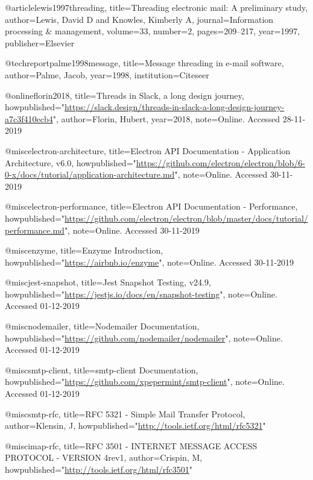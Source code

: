 
@article{lewis1997threading,
  title={{Threading electronic mail: A preliminary study}},
  author={Lewis, David D and Knowles, Kimberly A},
  journal={Information processing \& management},
  volume={33},
  number={2},
  pages={209--217},
  year={1997},
  publisher={Elsevier}
}

@techreport{palme1998message,
  title={{Message threading in e-mail software}},
  author={Palme, Jacob},
  year={1998},
  institution={Citeseer}
}

@online{florin2018,
  title={{Threads in Slack, a long design journey}},
  howpublished="\url{https://slack.design/threads-in-slack-a-long-design-journey-a7c3f410ecb4}",
  author={Florin, Hubert},
  year={2018},
  note={Online. Accessed 28-11-2019}
}

@misc{electron-architecture,
  title={{Electron API Documentation - Application Architecture, v6.0}},
  howpublished="\url{https://github.com/electron/electron/blob/6-0-x/docs/tutorial/application-architecture.md}",
  note={Online. Accessed 30-11-2019}
}

@misc{electron-performance,
  title={{Electron API Documentation - Performance}},
  howpublished="\url{https://github.com/electron/electron/blob/master/docs/tutorial/performance.md}",
  note={Online. Accessed 30-11-2019}
}

@misc{enzyme,
  title={{Enzyme Introduction}},
  howpublished="\url{https://airbnb.io/enzyme}",
  note={Online. Accessed 30-11-2019}
}

@misc{jest-snapshot,
  title={{Jest Snapshot Testing, v24.9}},
  howpublished="\url{https://jestjs.io/docs/en/snapshot-testing}",
  note={Online. Accessed 01-12-2019}
}

@misc{nodemailer,
  title={{Nodemailer Documentation}},
  howpublished="\url{https://github.com/nodemailer/nodemailer}",
  note={Online. Accessed 01-12-2019}
}

@misc{smtp-client,
  title={{smtp-client Documentation}},
  howpublished="\url{https://github.com/xpepermint/smtp-client}",
  note={Online. Accessed 01-12-2019}
}

@misc{smtp-rfc,
  title={{RFC 5321 - Simple Mail Transfer Protocol}},
  author={Klensin, J},
  howpublished="\url{http://tools.ietf.org/html/rfc5321}"
}

@misc{imap-rfc,
  title={{RFC 3501 - INTERNET MESSAGE ACCESS PROTOCOL - VERSION 4rev1}},
  author={Crispin, M},
  howpublished="\url{http://tools.ietf.org/html/rfc3501}"
}

